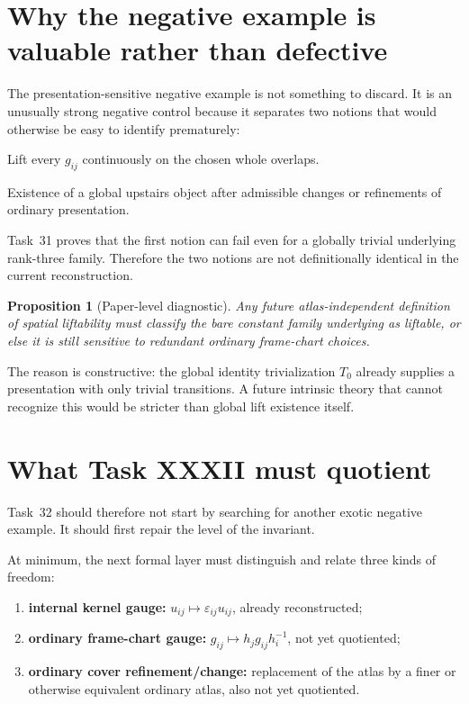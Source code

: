 \documentclass[11pt,a4paper]{article}
\newtheorem{proposition}{Proposition}
\theoremstyle{definition}
\newcommand{\code}[1]{\path{#1}}
\begin{document}
\section{Why the negative example is valuable rather than defective}\label{sec:value}

The presentation-sensitive negative example is not something to discard.  It is an unusually strong negative control because it separates two notions that would otherwise be easy to identify prematurely:
\begin{description}[leftmargin=8mm,style=nextline]
 \item[Direct fixed-atlas liftability.] Lift every $g_{ij}$ continuously on the chosen whole overlaps.
 \item[Intrinsic geometric liftability.] Existence of a global upstairs object after admissible changes or refinements of ordinary presentation.
\end{description}

Task~31 proves that the first notion can fail even for a globally trivial underlying rank-three family.  Therefore the two notions are not definitionally identical in the current reconstruction.

\begin{proposition}[Paper-level diagnostic]
Any future atlas-independent definition of spatial liftability must classify the bare constant family underlying \code{badFamily} as liftable, or else it is still sensitive to redundant ordinary frame-chart choices.
\end{proposition}

The reason is constructive: the global identity trivialization $T_0$ already supplies a presentation with only trivial transitions.  A future intrinsic theory that cannot recognize this would be stricter than global lift existence itself.

\section{What Task XXXII must quotient}\label{sec:xxxii-target}

Task~32 should therefore not start by searching for another exotic negative example.  It should first repair the level of the invariant.

At minimum, the next formal layer must distinguish and relate three kinds of freedom:
\begin{enumerate}[leftmargin=*]
 \item \textbf{internal kernel gauge:} $u_{ij}\mapsto\varepsilon_{ij}u_{ij}$, already reconstructed;
 \item \textbf{ordinary frame-chart gauge:} $g_{ij}\mapsto h_jg_{ij}h_i^{-1}$, not yet quotiented;
 \item \textbf{ordinary cover refinement/change:} replacement of the atlas by a finer or otherwise equivalent ordinary atlas, also not yet quotiented.
\end{enumerate}
\end{document}
